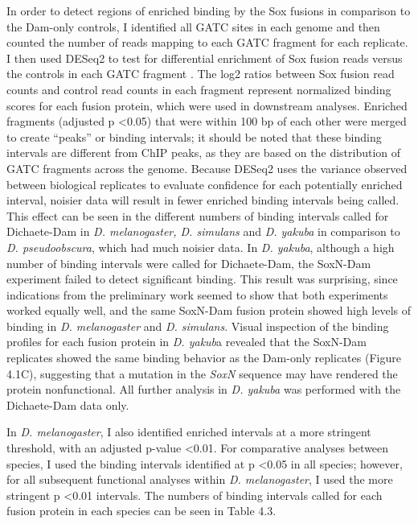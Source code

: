 In order to detect regions of enriched binding by the Sox fusions in comparison to the Dam-only controls, I identified all GATC sites in each genome and then counted the number of reads mapping to each GATC fragment for each replicate. I then used DESeq2 to test for differential enrichment of Sox fusion reads versus the controls in each GATC fragment \citep{love_moderated_2014}. The log2 ratios between Sox fusion read counts and control read counts in each fragment represent normalized binding scores for each fusion protein, which were used in downstream analyses. Enriched fragments (adjusted p \textless 0.05) that were within 100 bp of each other were merged to create “peaks” or binding intervals; it should be noted that these binding intervals are different from ChIP peaks, as they are based on the distribution of GATC fragments across the genome. Because DESeq2 uses the variance observed between biological replicates to evaluate confidence for each potentially enriched interval, noisier data will result in fewer enriched binding intervals being called. This effect can be seen in the different numbers of binding intervals called for Dichaete-Dam in \emph{D. melanogaster, D. simulans} and \emph{D. yakuba} in comparison to \emph{D. pseudoobscura}, which had much noisier data. In \emph{D. yakuba}, although a high number of binding intervals were called for Dichaete-Dam, the SoxN-Dam experiment failed to detect significant binding. This result was surprising, since indications from the preliminary work seemed to show that both experiments worked equally well, and the same SoxN-Dam fusion protein showed high levels of binding in \emph{D. melanogaster} and \emph{D. simulans}. Visual inspection of the binding profiles for each fusion protein in \emph{D. yakub}a revealed that the SoxN-Dam replicates showed the same binding behavior as the Dam-only replicates (Figure 4.1C), suggesting that a mutation in the \emph{SoxN} sequence may have rendered the protein nonfunctional. All further analysis in \emph{D. yakuba} was performed with the Dichaete-Dam data only.

In \emph{D. melanogaster}, I also identified enriched intervals at a more stringent threshold, with an adjusted p-value \textless 0.01. For comparative analyses between species, I used the binding intervals identified at p \textless 0.05 in all species; however, for all subsequent functional analyses within \emph{D. melanogaster}, I used the more stringent p \textless 0.01 intervals. The numbers of binding intervals called for each fusion protein in each species can be seen in Table 4.3.

